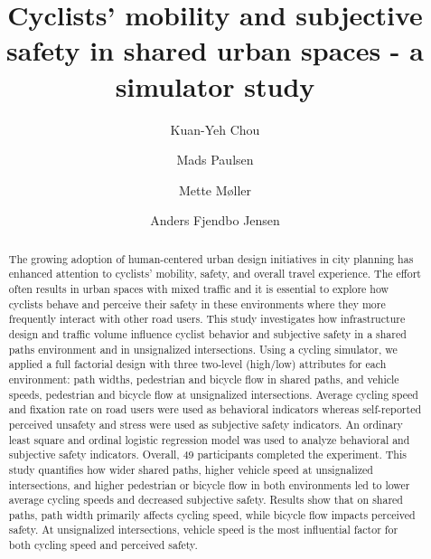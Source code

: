 \documentclass[3p,authoryear]{elsarticle}
\begin{document}
\begin{frontmatter}

\title{Cyclists' mobility and subjective safety in shared urban spaces -
       a simulator study}

\author{Kuan-Yeh Chou}
\author{Mads Paulsen}
\author{Mette Møller}
\author{Anders Fjendbo Jensen}

\address{Technical University of Denmark, Department of Technology, Management
  and Economics, Akademivej, Building 358, 2800 Kgs. Lyngby, Denmark}


\begin{abstract}
The growing adoption of human-centered urban design initiatives in city
planning has enhanced attention to cyclists' mobility, safety, and overall
travel experience. The effort often results in urban spaces with mixed traffic
and it is essential to explore how cyclists behave and perceive their safety in
these environments where they more frequently interact with other road users.
This study investigates how infrastructure design and traffic volume influence
cyclist behavior and subjective safety in a shared paths environment and in
unsignalized intersections. Using a cycling simulator, we applied a full
factorial design with three two-level (high/low) attributes for each
environment: path widths, pedestrian and bicycle flow in shared paths, and
vehicle speeds, pedestrian and bicycle flow at unsignalized intersections.
Average cycling speed and fixation rate on road users were used as behavioral
indicators whereas self-reported perceived unsafety and stress were used as
subjective safety indicators. An ordinary least square and ordinal logistic
regression model was used to analyze behavioral and subjective safety
indicators. Overall, 49 participants completed the experiment. This study
quantifies how wider shared paths, higher vehicle speed at unsignalized
intersections, and higher pedestrian or bicycle flow in both environments led
to lower average cycling speeds and decreased subjective safety. Results show
that on shared paths, path width primarily affects cycling speed, while bicycle
flow impacts perceived safety. At unsignalized intersections, vehicle speed is
the most influential factor for both cycling speed and perceived safety.
\end{abstract}

\end{frontmatter}
\end{document}
